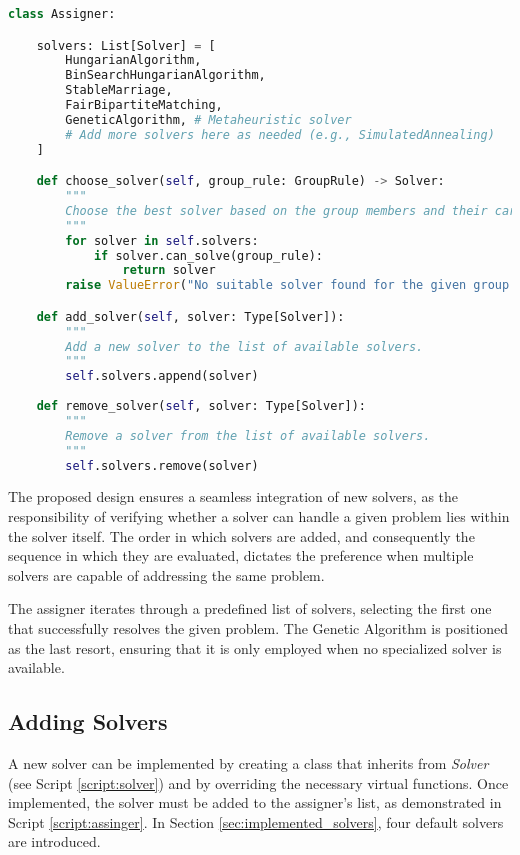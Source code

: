     \begin{lstlisting}[language=Python, caption={Assigner Class.}, label={script:assinger}]
class Assigner:

    solvers: List[Solver] = [
        HungarianAlgorithm,
        BinSearchHungarianAlgorithm,
        StableMarriage,
        FairBipartiteMatching,
        GeneticAlgorithm, # Metaheuristic solver
        # Add more solvers here as needed (e.g., SimulatedAnnealing)
    ]

    def choose_solver(self, group_rule: GroupRule) -> Solver:
        """
        Choose the best solver based on the group members and their cardinality.
        """
        for solver in self.solvers:
            if solver.can_solve(group_rule):
                return solver
        raise ValueError("No suitable solver found for the given group.")

    def add_solver(self, solver: Type[Solver]):
        """
        Add a new solver to the list of available solvers.
        """
        self.solvers.append(solver)
    
    def remove_solver(self, solver: Type[Solver]):
        """
        Remove a solver from the list of available solvers.
        """
        self.solvers.remove(solver)
\end{lstlisting}

            The proposed design ensures a seamless integration of new solvers, as the responsibility of verifying whether a solver can handle a given problem lies within the solver itself. The order in which solvers are added, and consequently the sequence in which they are evaluated, dictates the preference when multiple solvers are capable of addressing the same problem.

            The assigner iterates through a predefined list of solvers, selecting the first one that successfully resolves the given problem. The Genetic Algorithm is positioned as the last resort, ensuring that it is only employed when no specialized solver is available.

        \subsection{Adding Solvers}
            A new solver can be implemented by creating a class that inherits from \textit{Solver} (see Script \ref{script:solver}) and by overriding the necessary virtual functions.
            Once implemented, the solver must be added to the assigner's list, as demonstrated in Script \ref{script:assinger}.
            In Section \ref{sec:implemented_solvers}, four default solvers are introduced.

